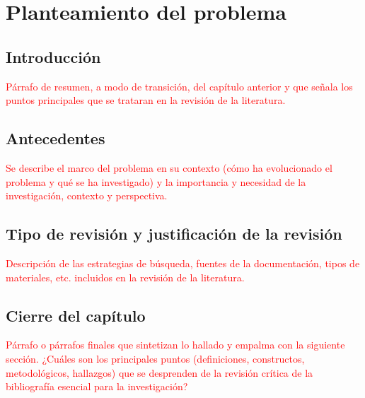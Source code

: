 \chapter{Planteamiento del problema}\label{cap:02}
\thispagestyle{empty}

\section{Introducción}
\textcolor{red}{Párrafo de resumen, a modo de transición, del capítulo anterior y que señala los puntos principales que 
se trataran en la revisión de la literatura.}

\section{Antecedentes}

\textcolor{red}{Se describe el marco del problema en su contexto (cómo ha evolucionado el problema y qué se ha 
investigado) y la importancia y necesidad de la investigación, contexto y perspectiva.}


\section{Tipo de revisión y justificación de la revisión}
\textcolor{red}{Descripción de las estrategias de búsqueda, fuentes de la documentación, tipos de materiales, etc. incluidos en la revisión de la literatura.}
 

\section{Cierre del capítulo}
\textcolor{red}{Párrafo o párrafos finales que sintetizan lo hallado y empalma con la siguiente sección.  ¿Cuáles son los principales puntos (definiciones, constructos, metodológicos, hallazgos) que se desprenden de la revisión crítica de la bibliografía esencial para la investigación?}
